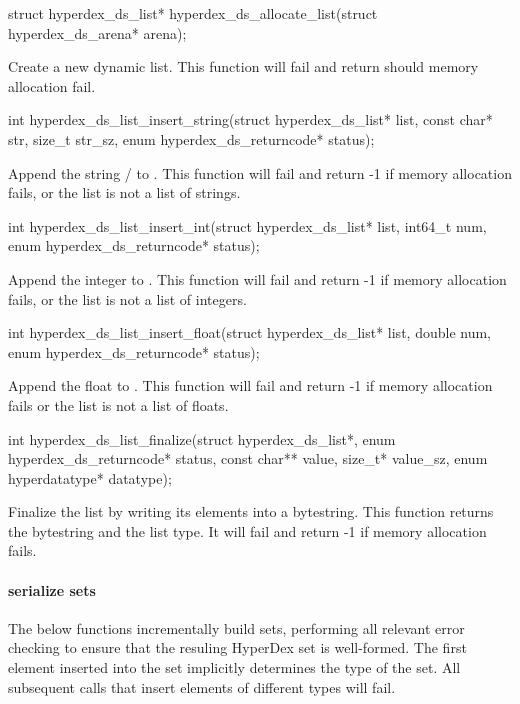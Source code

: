 \begin{ccode}
struct hyperdex_ds_list* hyperdex_ds_allocate_list(struct hyperdex_ds_arena* arena);
\end{ccode}
Create a new dynamic list.  This function will fail and return
 should memory allocation fail.

\begin{ccode}
int hyperdex_ds_list_insert_string(struct hyperdex_ds_list* list,
                                   const char* str, size_t str_sz,
                                   enum hyperdex_ds_returncode* status);
\end{ccode}
Append the string / to .  This
function will fail and return -1 if memory allocation fails, or the list is not
a list of strings.

\begin{ccode}
int hyperdex_ds_list_insert_int(struct hyperdex_ds_list* list, int64_t num,
                                enum hyperdex_ds_returncode* status);
\end{ccode}
Append the integer  to .  This function will fail
and return -1 if memory allocation fails, or the list is not a list of integers.

\begin{ccode}
int hyperdex_ds_list_insert_float(struct hyperdex_ds_list* list, double num,
                                  enum hyperdex_ds_returncode* status);
\end{ccode}
Append the float  to .  This function will fail
and return -1 if memory allocation fails or the list is not a list of floats.

\begin{ccode}
int hyperdex_ds_list_finalize(struct hyperdex_ds_list*,
                              enum hyperdex_ds_returncode* status,
                              const char** value, size_t* value_sz,
                              enum hyperdatatype* datatype);
\end{ccode}
Finalize the list by writing its elements into a bytestring.  This
function returns the bytestring and the list type.  It will fail and return -1
if memory allocation fails.

\paragraph{serialize sets}

The below functions incrementally build sets, performing all relevant error
checking to ensure that the resuling HyperDex set is well-formed.  The first
element inserted into the set implicitly determines the type of the set.  All
subsequent calls that insert elements of different types will fail.

